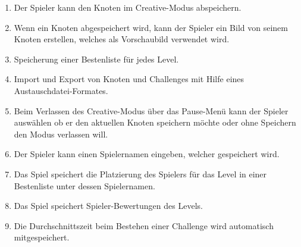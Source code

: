 \begin{enumerate}[resume]

\item Der Spieler kann den Knoten im Creative-Modus abspeichern.
\item Wenn ein Knoten abgespeichert wird, kann der Spieler ein Bild von seinem Knoten erstellen, welches als Vorschaubild verwendet wird. %
\item Speicherung einer Bestenliste für jedes Level.
\item Import und Export von Knoten und Challenges mit Hilfe eines Austauschdatei-Formates.
\item Beim Verlassen des Creative-Modus über das Pause-Menü  kann der Spieler auswählen ob er den aktuellen Knoten speichern möchte oder ohne Speichern den Modus verlassen will. %
\item Der Spieler kann einen Spielernamen eingeben, welcher gespeichert wird.
\item Das Spiel speichert die Platzierung des Spielers  für das Level in einer Bestenliste unter dessen Spielernamen.
\item Das Spiel speichert Spieler-Bewertungen des Levels. %
\item Die Durchschnittszeit beim Bestehen einer Challenge wird automatisch mitgespeichert. %


\end{enumerate}

	
